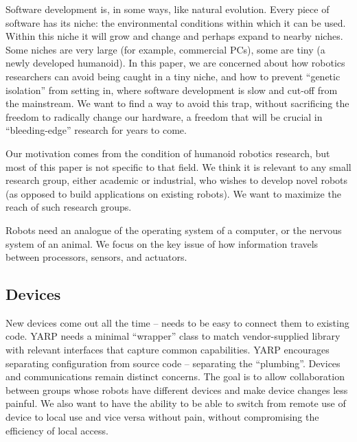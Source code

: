 Software development is, in some ways, like natural 
evolution.  Every piece of software has its niche:
the environmental conditions within which it can be
used.  Within this niche it will grow and change and 
perhaps expand to nearby niches.
Some niches are very large (for example, commercial PCs), some are
tiny (a newly developed humanoid).  In this paper, we are concerned
about how robotics researchers can avoid being caught in a tiny
niche, and how to prevent ``genetic isolation'' from setting in,
where software development is slow and cut-off from the mainstream.
We want to find a way to avoid this trap, without sacrificing
the freedom to radically change our hardware, a freedom that
will be crucial in ``bleeding-edge'' research for years to come.

Our motivation comes from the condition of humanoid robotics 
research, but most of this paper is not specific to that field.
%
We think it is relevant to any small research group, either academic or
industrial, who wishes to develop novel robots (as opposed to 
build applications on existing robots).  We want to maximize the 
reach of such research groups.










Robots need an analogue of the operating system of a computer, or the
nervous system of an animal.  We focus on the key issue of how information
travels between processors, sensors, and actuators.




\subsection*{Devices}

New devices come out all the time -- needs to be easy to connect them
to existing code.  YARP needs a minimal ``wrapper'' class to match
vendor-supplied library with relevant interfaces that capture common
capabilities.  YARP encourages separating configuration from source
code -- separating the ``plumbing''.  Devices and communications
remain distinct concerns.  The goal is to allow collaboration between
groups whose robots have different devices and make device changes
less painful.  We also want to have the ability to be able to switch
from remote use of device to local use and vice versa without pain,
without compromising the efficiency of local access.


